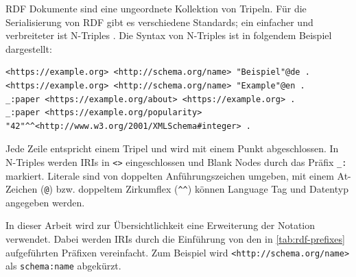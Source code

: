 RDF Dokumente sind eine ungeordnete Kollektion von Tripeln.
Für die Serialisierung von RDF gibt es verschiedene Standards; ein einfacher und verbreiteter ist N-Triples \cite{rdf-ntriples}.
Die Syntax von N-Triples ist in folgendem Beispiel dargestellt:
\begin{lstlisting}[language=SPARQL, breaklines=true]
<https://example.org> <http://schema.org/name> "Beispiel"@de .
<https://example.org> <http://schema.org/name> "Example"@en .
_:paper <https://example.org/about> <https://example.org> .
_:paper <https://example.org/popularity> "42"^^<http://www.w3.org/2001/XMLSchema#integer> .
\end{lstlisting}
Jede Zeile entspricht einem Tripel und wird mit einem Punkt abgeschlossen.
In N-Triples werden IRIs in \verb|<>| eingeschlossen und Blank Nodes durch das Präfix \verb|_:| markiert.
Literale sind von doppelten Anführungszeichen umgeben, mit einem At-Zeichen (\verb|@|) bzw. doppeltem Zirkumflex (\verb|^^|) können Language Tag und Datentyp angegeben werden.

In dieser Arbeit wird zur Übersichtlichkeit eine Erweiterung der Notation verwendet.
Dabei werden IRIs durch die Einführung von den in \cref{tab:rdf-prefixes} aufgeführten Präfixen vereinfacht.
Zum Beispiel wird \verb|<http://schema.org/name>| als \verb|schema:name| abgekürzt. 

